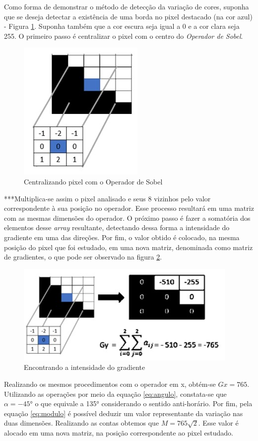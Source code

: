\documentclass[a4paper,alpha-refs]{RBCA_v1.0}
\begin{document}
Como forma de demonstrar o método de detecção da variação de cores, suponha que se deseja detectar a existência de uma borda no pixel destacado (na cor azul) - Figura \ref{img:Primeira}. Suponha também que a cor escura seja igual a 0 e a cor clara seja 255. O primeiro passo é centralizar o pixel com o centro do \textit{Operador de Sobel}.

\begin{figure}[h!]
	\centering
	\includegraphics[width=.3\textwidth]{img/1im.jpg}
	\caption{Centralizando pixel com o Operador de Sobel}
	\label{img:Primeira}
\end{figure}

***Multiplica-se assim o pixel analisado e seus 8 vizinhos pelo valor correspondente à sua posição no operador. Esse processo resultará em uma matriz com as mesmas dimensões do operador. O próximo passo é fazer a somatória dos elementos desse \textit{array} resultante, detectando dessa forma a intensidade do gradiente em uma das direções. Por fim, o valor obtido é colocado, na mesma posição do pixel que foi estudado, em uma nova matriz, denominada como matriz de gradientes, o que pode ser observado na figura \ref{img:grady}. 

\begin{figure}[h!]
	\centering
	\includegraphics[width=.3\textwidth]{img/grady.jpg}
	\caption{Encontrando a intensidade do gradiente}
	\label{img:grady}
\end{figure}

Realizando os mesmos procedimentos com o operador em x, obtém-se $Gx = 765$. Utilizando as operações por meio da equação \ref{eq:angulo}, constata-se que $\alpha = -45$° o que equivale a 135° considerando o sentido anti-horário. Por fim, pela equação \ref{eq:modulo} é possível deduzir um valor representante da variação nas duas dimensões. Realizando as contas obtemos que $M = 765\sqrt{2}$. Esse valor é alocado em uma nova matriz, na posição correspondente ao pixel estudado.
\end{document}
